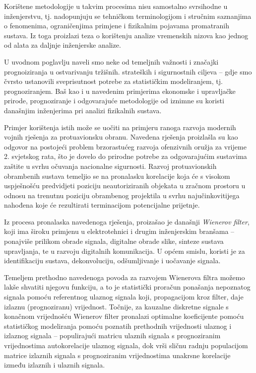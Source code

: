 \documentclass[a4paper,12pt,oneside]{memoir}
\begin{document}
                Korištene metodologije u takvim procesima nisu samostalno svrsihodne u inženjerstvu, tj. nadopunjuju se tehničkom terminologijom i stručnim saznanjima o fenomenima, ograničenjima primjene i fizikalnim pojavama promatranih sustava. Iz toga proizlazi teza o korištenju analize vremenskih nizova kao jednog od alata za daljnje inženjerske analize.


                U uvodnom poglavlju naveli smo neke od temeljnih važnosti i značajki prognoiziranja u ostvarivanju tržišnih. strateških i sigurnostnih ciljeva -- gdje smo čvrsto ustanovili sveprisutnost potrebe za statističkim modeliranjem, tj. prognoziranjem. Baš kao i u navedenim primjerima ekonomske i upravljačke prirode, prognoziranje i odgovarajuće metodologije od iznimne su koristi današnjim inženjerima pri analizi fizikalnih sustava. 
                
                Primjer korištenja istih može se uočiti na primjeru ranoga razvoja modernih vojnih rješenja za protuavionsku obranu. Navedena rješenja proizlašla su kao odgovor na postojeći problem brzorastućeg razvoja ofenzivnih oružja za vrijeme 2. svjetskog rata, što je dovelo do prirodne potrebe za odgovarajućim sustavima zaštite u svrhu očuvanja nacionalne  sigurnosti. Razvoj protuavionskih obrambenih sustava temeljio se na pronalasku korelacije koja će s visokom uspješnošću predvidjeti poziciju neautoriziranih objekata u zračnom prostoru u odnosu na trenutnu poziciju obrambenog projektila u svrhu najučinkovitijega nahođena koje će rezultirati terminacijom potencijalne prijetnje.
                
                Iz procesa pronalaska navedenoga rješenja, proizašao je današnji \textit{Wienerov filter}, koji ima široku primjenu u elektrotehnici i drugim inženjerskim branšama -- ponajviše prilikom obrade signala, digitalne obrade slike, sinteze sustava upravljanja, te u razvoju digitalnih komunikacija. U općem smislu, koristi je za identifikaciju sustava, dekonvoluciju, odšumljivanje i uočavanje signala.

                Temeljem prethodno navedenoga povoda za razvojem Wienerova filtra možemo lakše shvatiti njegovu funkciju, a to je statistički proračun ponašanja nepoznatog signala pomoću referentnog ulaznog signala koji, propagacijom kroz filter, daje izlaznu (prognoziranu) vrijednost. Točnije, za kauzalne diskretne signale s konačnom vrijednošću Wienerov filter pronalazi optimalne koeficijente pomoću statističkog modeliranja pomoću poznatih prethodnih vrijednosti ulaznog i izlaznog signala -- populirajući matricu ulaznih signala s prognoziranim vrijednostima autokorelacije ulaznog signala, dok vrši sličnu radnju populacijom matrice izlaznih signala s prognoziranim vrijednostima unakrsne korelacije između izlaznih i ulaznih signala.
\end{document}
